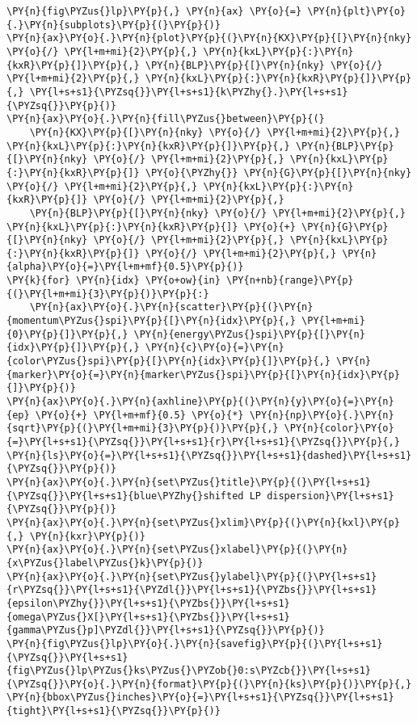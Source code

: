 \begin{Verbatim}[commandchars=\\\{\}]
\PY{n}{fig\PYZus{}lp}\PY{p}{,} \PY{n}{ax} \PY{o}{=} \PY{n}{plt}\PY{o}{.}\PY{n}{subplots}\PY{p}{(}\PY{p}{)}
\PY{n}{ax}\PY{o}{.}\PY{n}{plot}\PY{p}{(}\PY{n}{KX}\PY{p}{[}\PY{n}{nky} \PY{o}{/} \PY{l+m+mi}{2}\PY{p}{,} \PY{n}{kxL}\PY{p}{:}\PY{n}{kxR}\PY{p}{]}\PY{p}{,} \PY{n}{BLP}\PY{p}{[}\PY{n}{nky} \PY{o}{/} \PY{l+m+mi}{2}\PY{p}{,} \PY{n}{kxL}\PY{p}{:}\PY{n}{kxR}\PY{p}{]}\PY{p}{,} \PY{l+s+s1}{\PYZsq{}}\PY{l+s+s1}{k\PYZhy{}.}\PY{l+s+s1}{\PYZsq{}}\PY{p}{)}
\PY{n}{ax}\PY{o}{.}\PY{n}{fill\PYZus{}between}\PY{p}{(}
    \PY{n}{KX}\PY{p}{[}\PY{n}{nky} \PY{o}{/} \PY{l+m+mi}{2}\PY{p}{,} \PY{n}{kxL}\PY{p}{:}\PY{n}{kxR}\PY{p}{]}\PY{p}{,} \PY{n}{BLP}\PY{p}{[}\PY{n}{nky} \PY{o}{/} \PY{l+m+mi}{2}\PY{p}{,} \PY{n}{kxL}\PY{p}{:}\PY{n}{kxR}\PY{p}{]} \PY{o}{\PYZhy{}} \PY{n}{G}\PY{p}{[}\PY{n}{nky} \PY{o}{/} \PY{l+m+mi}{2}\PY{p}{,} \PY{n}{kxL}\PY{p}{:}\PY{n}{kxR}\PY{p}{]} \PY{o}{/} \PY{l+m+mi}{2}\PY{p}{,}
    \PY{n}{BLP}\PY{p}{[}\PY{n}{nky} \PY{o}{/} \PY{l+m+mi}{2}\PY{p}{,} \PY{n}{kxL}\PY{p}{:}\PY{n}{kxR}\PY{p}{]} \PY{o}{+} \PY{n}{G}\PY{p}{[}\PY{n}{nky} \PY{o}{/} \PY{l+m+mi}{2}\PY{p}{,} \PY{n}{kxL}\PY{p}{:}\PY{n}{kxR}\PY{p}{]} \PY{o}{/} \PY{l+m+mi}{2}\PY{p}{,} \PY{n}{alpha}\PY{o}{=}\PY{l+m+mf}{0.5}\PY{p}{)}
\PY{k}{for} \PY{n}{idx} \PY{o+ow}{in} \PY{n+nb}{range}\PY{p}{(}\PY{l+m+mi}{3}\PY{p}{)}\PY{p}{:}
    \PY{n}{ax}\PY{o}{.}\PY{n}{scatter}\PY{p}{(}\PY{n}{momentum\PYZus{}spi}\PY{p}{[}\PY{n}{idx}\PY{p}{,} \PY{l+m+mi}{0}\PY{p}{]}\PY{p}{,} \PY{n}{energy\PYZus{}spi}\PY{p}{[}\PY{n}{idx}\PY{p}{]}\PY{p}{,} \PY{n}{c}\PY{o}{=}\PY{n}{color\PYZus{}spi}\PY{p}{[}\PY{n}{idx}\PY{p}{]}\PY{p}{,} \PY{n}{marker}\PY{o}{=}\PY{n}{marker\PYZus{}spi}\PY{p}{[}\PY{n}{idx}\PY{p}{]}\PY{p}{)}
\PY{n}{ax}\PY{o}{.}\PY{n}{axhline}\PY{p}{(}\PY{n}{y}\PY{o}{=}\PY{n}{ep} \PY{o}{+} \PY{l+m+mf}{0.5} \PY{o}{*} \PY{n}{np}\PY{o}{.}\PY{n}{sqrt}\PY{p}{(}\PY{l+m+mi}{3}\PY{p}{)}\PY{p}{,} \PY{n}{color}\PY{o}{=}\PY{l+s+s1}{\PYZsq{}}\PY{l+s+s1}{r}\PY{l+s+s1}{\PYZsq{}}\PY{p}{,} \PY{n}{ls}\PY{o}{=}\PY{l+s+s1}{\PYZsq{}}\PY{l+s+s1}{dashed}\PY{l+s+s1}{\PYZsq{}}\PY{p}{)}
\PY{n}{ax}\PY{o}{.}\PY{n}{set\PYZus{}title}\PY{p}{(}\PY{l+s+s1}{\PYZsq{}}\PY{l+s+s1}{blue\PYZhy{}shifted LP dispersion}\PY{l+s+s1}{\PYZsq{}}\PY{p}{)}
\PY{n}{ax}\PY{o}{.}\PY{n}{set\PYZus{}xlim}\PY{p}{(}\PY{n}{kxl}\PY{p}{,} \PY{n}{kxr}\PY{p}{)}
\PY{n}{ax}\PY{o}{.}\PY{n}{set\PYZus{}xlabel}\PY{p}{(}\PY{n}{x\PYZus{}label\PYZus{}k}\PY{p}{)}
\PY{n}{ax}\PY{o}{.}\PY{n}{set\PYZus{}ylabel}\PY{p}{(}\PY{l+s+s1}{r\PYZsq{}}\PY{l+s+s1}{\PYZdl{}}\PY{l+s+s1}{\PYZbs{}}\PY{l+s+s1}{epsilon\PYZhy{}}\PY{l+s+s1}{\PYZbs{}}\PY{l+s+s1}{omega\PYZus{}X[}\PY{l+s+s1}{\PYZbs{}}\PY{l+s+s1}{gamma\PYZus{}p]\PYZdl{}}\PY{l+s+s1}{\PYZsq{}}\PY{p}{)}
\PY{n}{fig\PYZus{}lp}\PY{o}{.}\PY{n}{savefig}\PY{p}{(}\PY{l+s+s1}{\PYZsq{}}\PY{l+s+s1}{fig\PYZus{}lp\PYZus{}ks\PYZus{}\PYZob{}0:s\PYZcb{}}\PY{l+s+s1}{\PYZsq{}}\PY{o}{.}\PY{n}{format}\PY{p}{(}\PY{n}{ks}\PY{p}{)}\PY{p}{,} \PY{n}{bbox\PYZus{}inches}\PY{o}{=}\PY{l+s+s1}{\PYZsq{}}\PY{l+s+s1}{tight}\PY{l+s+s1}{\PYZsq{}}\PY{p}{)}


\end{Verbatim}
